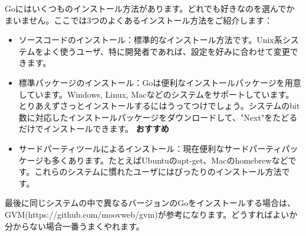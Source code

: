 Goにはいくつものインストール方法があります。どれでも好きなのを選んでかまいません。ここでは3つのよくあるインストール方法をご紹介します：

\begin{itemize}
  \item ソースコードのインストール：標準的なインストール方法です。Unix系システムをよく使うユーザ、特に開発者であれば、設定を好みに合わせて変更できます。
  \item 標準パッケージのインストール：Goは便利なインストールパッケージを用意しています。Windows, Linux, Macなどのシステムをサポートしています。とりあえずさっとインストールするにはうってつけでしょう。システムのbit数に対応したインストールパッケージをダウンロードして、"Next"をたどるだけでインストールできます。 \textbf{おすすめ}
  \item サードパーティツールによるインストール：現在便利なサードパーティパッケージも多くあります。たとえばUbuntuのapt-get、Macのhomebrewなどです。これらのシステムに慣れたユーザにはぴったりのインストール方法です。
\end{itemize}

最後に同じシステムの中で異なるバージョンのGoをインストールする場合は、GVM(https:\//\//github.com\//moovweb\//gvm)が参考になります。どうすればよいか分からない場合一番うまくやれます。
